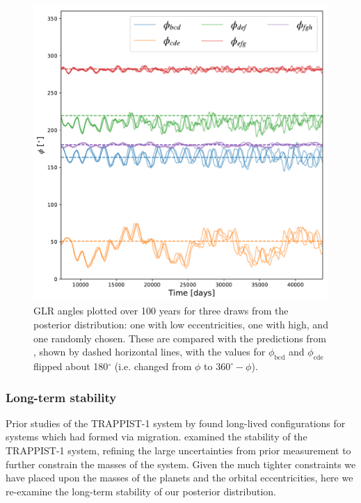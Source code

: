 \documentclass[twocolumn]{aastex63}
\begin{document}
\begin{figure}
    \centering
    \includegraphics[width =\hsize]{figures/Laplace_angle.pdf}
    \caption{GLR angles plotted over 100 years for
    three draws from the posterior distribution:  one with low eccentricities,
    one with high, and one randomly chosen.  These are
    compared with the predictions from \citet{Mah2018}, shown by
    dashed horizontal lines, with
    the values for $\phi_\mathrm{bcd}$ and $\phi_\mathrm{cde}$ flipped about
    180$^\circ$ (i.e. changed from $\phi$ to $360^\circ - \phi$).}
    \label{fig:laplace_angles}
\end{figure}

\subsubsection{Long-term stability}

Prior studies of the TRAPPIST-1 system by 
\citet{Tamayo2017} found long-lived configurations for
systems which had formed via migration.  \citet{Quarles2017} examined the stability
of the TRAPPIST-1 system,  refining the large uncertainties from prior
measurement \citep{Gillon2017} to further constrain the masses of
the system.  Given the much tighter constraints we have placed upon
the masses of the planets and the orbital eccentricities, here we
re-examine the long-term stability of our posterior distribution.
\end{document}
